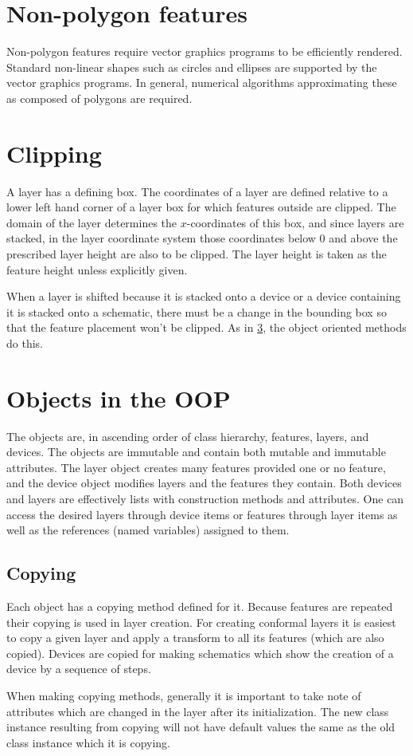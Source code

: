 \documentclass{article}
\begin{document}
\section{Non-polygon features}
Non-polygon features require vector graphics programs to be efficiently rendered. Standard non-linear shapes such as circles and ellipses are supported by the vector graphics programs. In general, numerical algorithms approximating these as composed of polygons are required.

\section{Clipping}
A layer has a defining box. The coordinates of a layer are defined relative to a lower left hand corner of a layer box for which features outside are clipped. The domain of the layer determines the $x$-coordinates of this box, and since layers are stacked, in the layer coordinate system those coordinates below 0 and above the prescribed layer height are also to be clipped. The layer height is taken as the feature height unless explicitly given.

When a layer is shifted because it is stacked onto a device or a device containing it is stacked onto a schematic, there must be a change in the bounding box so that the feature placement won't be clipped. As in \ref{sec:oop}, the object oriented methods do this.

\section{Objects in the OOP}\label{sec:oop}
The objects are, in ascending order of class hierarchy, features, layers, and devices. The objects are immutable and contain both mutable and immutable attributes. The layer object creates many features provided one or no feature, and the device object modifies layers and the features they contain. Both devices and layers are effectively lists with construction methods and attributes. One can access the desired layers through device items or features through layer items as well as the references (named variables) assigned to them.

\subsection{Copying} 
Each object has a copying method defined for it. Because features are repeated their copying is used in layer creation. For creating conformal layers it is easiest to copy a given layer and apply a transform to all its features (which are also copied). Devices are copied for making schematics which show the creation of a device by a sequence of steps.

When making copying methods, generally it is important to take note of attributes which are changed in the layer after its initialization. The new class instance resulting from copying will not have default values the same as the old class instance which it is copying.
\end{document}
